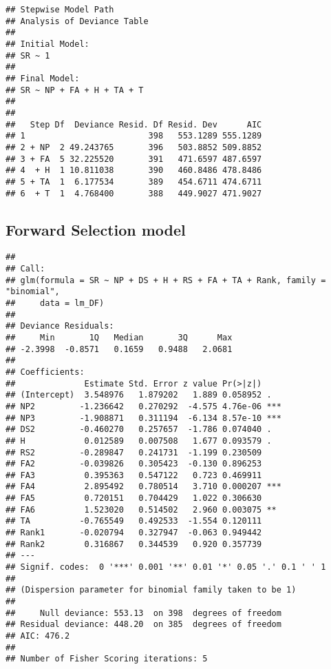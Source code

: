 \documentclass[]{article}
\begin{document}
\begin{verbatim}
## Stepwise Model Path 
## Analysis of Deviance Table
## 
## Initial Model:
## SR ~ 1
## 
## Final Model:
## SR ~ NP + FA + H + TA + T
## 
## 
##   Step Df  Deviance Resid. Df Resid. Dev      AIC
## 1                         398   553.1289 555.1289
## 2 + NP  2 49.243765       396   503.8852 509.8852
## 3 + FA  5 32.225520       391   471.6597 487.6597
## 4  + H  1 10.811038       390   460.8486 478.8486
## 5 + TA  1  6.177534       389   454.6711 474.6711
## 6  + T  1  4.768400       388   449.9027 471.9027
\end{verbatim}

\newpage

\hypertarget{forward-selection-model}{%
\subsection{Forward Selection model}\label{forward-selection-model}}

\begin{verbatim}
## 
## Call:
## glm(formula = SR ~ NP + DS + H + RS + FA + TA + Rank, family = "binomial", 
##     data = lm_DF)
## 
## Deviance Residuals: 
##     Min       1Q   Median       3Q      Max  
## -2.3998  -0.8571   0.1659   0.9488   2.0681  
## 
## Coefficients:
##              Estimate Std. Error z value Pr(>|z|)    
## (Intercept)  3.548976   1.879202   1.889 0.058952 .  
## NP2         -1.236642   0.270292  -4.575 4.76e-06 ***
## NP3         -1.908871   0.311194  -6.134 8.57e-10 ***
## DS2         -0.460270   0.257657  -1.786 0.074040 .  
## H            0.012589   0.007508   1.677 0.093579 .  
## RS2         -0.289847   0.241731  -1.199 0.230509    
## FA2         -0.039826   0.305423  -0.130 0.896253    
## FA3          0.395363   0.547122   0.723 0.469911    
## FA4          2.895492   0.780514   3.710 0.000207 ***
## FA5          0.720151   0.704429   1.022 0.306630    
## FA6          1.523020   0.514502   2.960 0.003075 ** 
## TA          -0.765549   0.492533  -1.554 0.120111    
## Rank1       -0.020794   0.327947  -0.063 0.949442    
## Rank2        0.316867   0.344539   0.920 0.357739    
## ---
## Signif. codes:  0 '***' 0.001 '**' 0.01 '*' 0.05 '.' 0.1 ' ' 1
## 
## (Dispersion parameter for binomial family taken to be 1)
## 
##     Null deviance: 553.13  on 398  degrees of freedom
## Residual deviance: 448.20  on 385  degrees of freedom
## AIC: 476.2
## 
## Number of Fisher Scoring iterations: 5
\end{verbatim}
\end{document}
